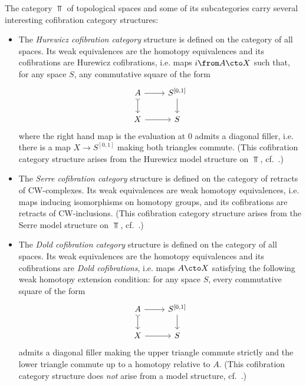 \begin{example} \label{ex:top-cofib-cat}
  The category $\Top$ of topological spaces and some of its subcategories carry several interesting cofibration category structures:
  \begin{itemize}
      \item The \emph{Hurewicz cofibration category} structure is defined on the category of all spaces.
      Its weak equivalences are the homotopy equivalences and its cofibrations are Hurewicz cofibrations, i.e. maps $i \from A \cto X$ such that, for any space $S$, any commutative square of the form
      \[ \begin{tikzcd}
        A \arrow[r] \arrow[d,tail] & S^{[0,1]} \arrow[d] \\
        X \arrow[r] & S
      \end{tikzcd} \]
      where the right hand map is the evaluation at $0$ admits a diagonal filler, i.e. there is a map $X \to S^{[0,1]}$ making both triangles commute.
      (This cofibration category structure arises from the Hurewicz model structure on $\Top$, cf.~\cite[Thm.~3]{strom}.)
      \item The \emph{Serre cofibration category} structure is defined on the category of retracts of CW-complexes.
      Its weak equivalences are weak homotopy equivalences, i.e. maps inducing isomorphisms on homotopy groups, and its cofibrations are retracts of CW-inclusions.
      (This cofibration category structure arises from the Serre model structure on $\Top$, cf.~\cite[Thm.~2.4.19]{hovey:book}.)
      \item The \emph{Dold cofibration category} structure is defined on the category of all spaces.
      Its weak equivalences are the homotopy equivalences and its cofibrations are \emph{Dold cofibrations}, i.e. maps $A \cto X$ satisfying the following weak homotopy extension condition: for any space $S$, every commutative square of the form
      \[ \begin{tikzcd}
        A \arrow[r] \arrow[d,tail] & S^{[0,1]} \arrow[d] \\
        X \arrow[r] & S
      \end{tikzcd} \]
      admits a diagonal filler making the upper triangle commute strictly and the lower triangle commute up to a homotopy relative to $A$.
      (This cofibration category structure does {\em not} arise from a model structure, cf.~\cite[Thm.~1.32.(2)]{szumilo:two-models}.)
  \end{itemize}
\end{example}

